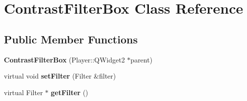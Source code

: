 \hypertarget{classContrastFilterBox}{}\section{Contrast\+Filter\+Box Class Reference}
\label{classContrastFilterBox}
\subsection*{Public Member Functions}
\begin{DoxyCompactItemize}
\item 
\hypertarget{classContrastFilterBox_ac649ab802dbaf805e480b3a84ec5b55b}{}{\bfseries Contrast\+Filter\+Box} (Player\+::\+Q\+Widget2 $\ast$parent)\label{classContrastFilterBox_ac649ab802dbaf805e480b3a84ec5b55b}

\item 
\hypertarget{classContrastFilterBox_a09e99b0db09b8468ce7d7e0f98293ac5}{}virtual void {\bfseries set\+Filter} (Filter \&filter)\label{classContrastFilterBox_a09e99b0db09b8468ce7d7e0f98293ac5}

\item 
\hypertarget{classContrastFilterBox_ad7b14770615490d1445c958c79fd3adb}{}virtual Filter $\ast$ {\bfseries get\+Filter} ()\label{classContrastFilterBox_ad7b14770615490d1445c958c79fd3adb}

\end{DoxyCompactItemize}
